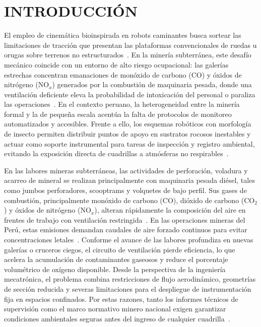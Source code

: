 \chapter{INTRODUCCIÓN}


El empleo de cinemática bioinspirada en robots caminantes busca sortear las limitaciones de tracción que presentan las plataformas convencionales de ruedas u orugas sobre terrenos no estructurados~\cite{James2021_InsectLegDesign, DungBeetle_2023_Cybernetics}. En la minería subterránea, este desafío mecánico coincide con un entorno de alto riesgo ocupacional: las galerías estrechas concentran emanaciones de monóxido de carbono ($\text{CO}$) y óxidos de nitrógeno ($\text{NO}_x$) generados por la combustión de maquinaria pesada, donde una ventilación deficiente eleva la probabilidad de intoxicación del personal o paraliza las operaciones~\cite{AdvancesMining_2023, AdaptiveControl_Mines_2025}. En el contexto peruano, la heterogeneidad entre la minería formal y la de pequeña escala acentúa la falta de protocolos de monitoreo automatizados y accesibles. Frente a ello, los esquemas robóticos con morfología de insecto permiten distribuir puntos de apoyo en sustratos rocosos inestables y actuar como soporte instrumental para tareas de inspección y registro ambiental, evitando la exposición directa de cuadrillas a atmósferas no respirables~\cite{KimChoi_2025_MineMapping, Zhou2023_BioinspiredSensors, Liu2025_PiezoBioinspired}.



En las labores mineras subterráneas, las actividades de perforación, voladura y acarreo de mineral se realizan principalmente con maquinaria pesada diésel, tales como jumbos perforadores, scooptrams y volquetes de bajo perfil. Sus gases de combustión, principalmente monóxido de carbono ($\text{CO}$), dióxido de carbono ($\text{CO}_2$) y óxidos de nitrógeno ($\text{NO}_x$), alteran rápidamente la composición del aire en frentes de trabajo con ventilación restringida~\cite{Rodriguez2023_EconomiaCircularMinera, TorresSalazar2021_Diesel}. En las operaciones mineras del Perú, estas emisiones demandan caudales de aire forzado continuos para evitar concentraciones letales~\cite{Cortez2016_GEI_Minas}. Conforme el avance de las labores profundiza en nuevas galerías o cruceros ciegos, el circuito de ventilación pierde eficiencia, lo que acelera la acumulación de contaminantes gaseosos y reduce el porcentaje volumétrico de oxígeno disponible. Desde la perspectiva de la ingeniería mecatrónica, el problema combina restricciones de flujo aerodinámico, geometrías de sección reducida y severas limitaciones para el despliegue de instrumentación fija en espacios confinados. Por estas razones, tanto los informes técnicos de supervisión como el marco normativo minero nacional exigen garantizar condiciones ambientales seguras antes del ingreso de cualquier cuadrilla~\cite{OSINERGMIN_BoletinGSM_2020, MINEM_DS024_2016}.

